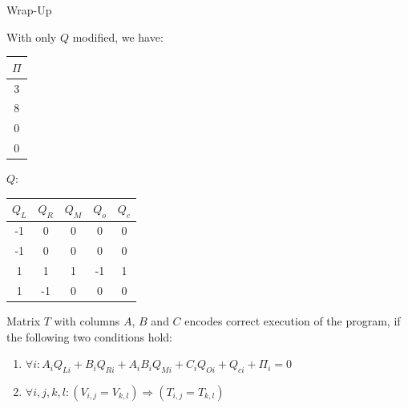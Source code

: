 \documentclass{zkdl-presentation-template}
\begin{document}
    \begin{frame}{Wrap-Up}
        \begin{example}
            With only $Q$ modified, we have:
            \centering 
            \begin{center}
                \begin{tabular}{|c|}
                    \hline
                    $\Pi$ \\ 
                    \hline
                    3 \\ 
                    \hline
                    8 \\ 
                    \hline
                    0 \\ 
                    \hline
                    0 \\ 
                    \hline
                \end{tabular} \hspace{1cm}
            $Q$: 
                \begin{tabular}{|c|c|c|c|c|}
                    \hline
                    $Q_L$ & $Q_R$ & $Q_M$ & $Q_o$ & $Q_c$ \\ 
                    \hline
                    -1 & 0 & 0 & 0 & 0 \\ 
                    \hline
                    -1 & 0 & 0 & 0 & 0 \\ 
                    \hline
                    1 & 1 & 1 & -1 & 1 \\ 
                    \hline
                    1 & -1 & 0 & 0 & 0 \\ 
                    \hline
                \end{tabular}
            \end{center}
        \end{example}

        \begin{definition}
            Matrix $T$ with columns $A$, $B$ and $C$ encodes correct execution of the program, if the following two conditions hold:
            \begin{enumerate}
                \item \(\forall i: A_i Q_{Li} + B_i Q_{Ri} + A_i B_i Q_{Mi} + C_i Q_{Oi} + Q_{ci} + \Pi_i = 0\)
                \item \(\forall i, j, k, l: (V_{i,j} = V_{k,l}) \Rightarrow (T_{i,j} = T_{k,l})\)
            \end{enumerate}
        \end{definition}
    \end{frame}
\end{document}
